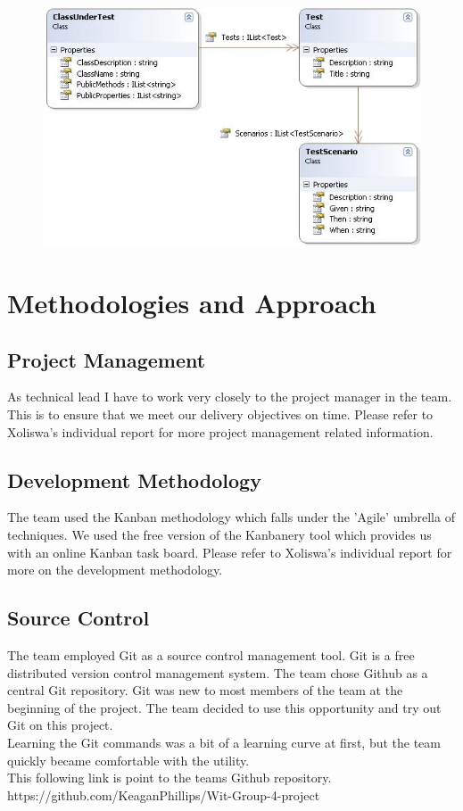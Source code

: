\documentclass[a4paper,12pt]{article}
\begin{document}
\begin{center}
	\begin{figure}
		\includegraphics{classdiagram.jpg}
			\caption{}	    
	\end{figure}	
\end{center}



\section{Methodologies and Approach}
\subsection{Project Management}
As technical lead I have to work very closely to the project manager in the team. This is to ensure that we meet our delivery objectives on time. Please refer to Xoliswa's individual\cite{xoli} report for more project management related information. 
\subsection{Development Methodology}
The team used the Kanban methodology which falls under the 'Agile' umbrella of techniques. We used the free version of the Kanbanery tool which provides us with an online Kanban task board. Please refer to Xoliswa's individual report\cite{xoli} for more on the development methodology.
\subsection{Source Control}
The team employed Git\cite{gitref} as a source control management tool. Git is a free distributed version control management system. The team chose Github\cite{github} as a central Git repository. Git was new to most members of the team at the beginning of the project. The team decided to use this opportunity and try out Git on this project.\\
\linebreak
Learning the Git commands was a bit of a learning curve at first, but the team quickly became comfortable with the utility.\\
\linebreak
This following link is point to the teams Github repository.\\ 
https://github.com/KeaganPhillips/Wit-Group-4-project
\end{document}
